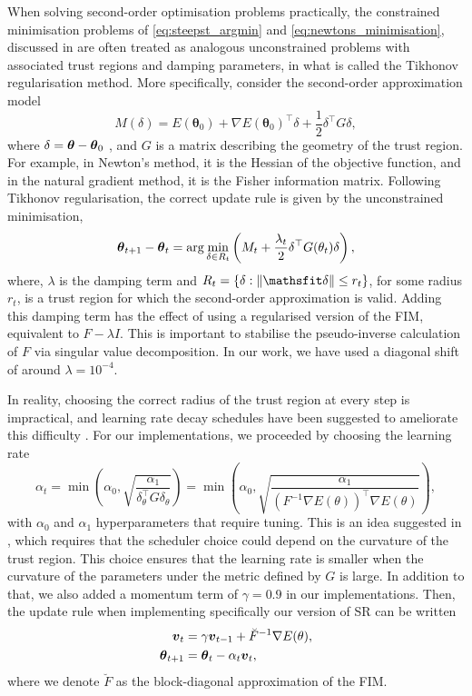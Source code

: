 When solving second-order optimisation problems practically, the constrained minimisation problems of \eqref{eq:steepst_argmin} and \eqref{eq:newtons_minimisation}, discussed in  are often treated as analogous unconstrained problems with associated trust regions and damping parameters, in what is called the Tikhonov regularisation method. More specifically, consider the second-order approximation model
\begin{equation*}
M(\delta) = E(\boldsymbol{\theta}_0) + \nabla E(\boldsymbol{\theta}_0)^\top \delta + \frac{1}{2} \delta^\top G \delta,
\end{equation*}
where 
$\delta = \boldsymbol{\theta} - \boldsymbol{\theta}_0$ , and 
$G$ is a matrix describing the geometry of the trust region. For example, in Newton's method, it is the Hessian of the objective function, and in the natural gradient method, it is the Fisher information matrix. Following Tikhonov regularisation, the correct update rule is given by the unconstrained minimisation,
\begin{align*}
    \boldsymbol{\theta}_{t+1}- \boldsymbol{\theta}_t = \arg \min_{\delta\in R_t} \left(M_t + \frac{\lambda_t}{2} \delta^\top G(\theta_t)\delta\right),
\end{align*}
where, $\lambda$ is the damping term and $R_t = \{\delta : \norm{\delta} \le r_t\}$, for some radius $r_t$, is a trust region for which the second-order approximation is valid. Adding this damping term has the effect of using a regularised version of the FIM, equivalent to $F - \lambda I$. This is important to stabilise the pseudo-inverse calculation of $F$ via singular value decomposition. In our work, we have used a diagonal shift of around $\lambda = 10^{-4}$.

In reality, choosing the correct radius of the trust region at every step is impractical, and learning rate decay schedules have been suggested to ameliorate this difficulty \cite{glasser2018neural}. For our implementations, we proceeded by choosing the learning rate
\begin{equation*}
     \alpha_t = \min\left(\alpha_0, \sqrt{\frac{\alpha_1}{\delta_\theta^\top G \delta_\theta}} \right)= \min\left(\alpha_0, \sqrt{\frac{\alpha_1}{(F^{-1} \nabla E(\theta))^\top \nabla E(\theta)}} \right),
\end{equation*}
with $\alpha_0$ and $\alpha_1$ hyperparameters that require tuning. This is an idea suggested in \cite{sheng}, which requires that the scheduler choice could depend on the curvature of the trust region. This choice ensures that the learning rate is smaller when the curvature of the parameters under the metric defined by $G$ is large. In addition to that, we also added a momentum term of $\gamma = 0.9$ in our implementations. Then, the update rule when implementing specifically our version of SR can be written 
\begin{align*}
    \boldsymbol{v}_t &= \gamma \boldsymbol{v}_{t-1}  + \breve{F}^{-1}\nabla E(\theta), \\
    \boldsymbol{\theta}_{t+1} &= \boldsymbol{\theta}_{t} - \alpha_t\boldsymbol{v}_t,
\end{align*}
where we denote $\breve{F}$ as the block-diagonal approximation of the FIM.

